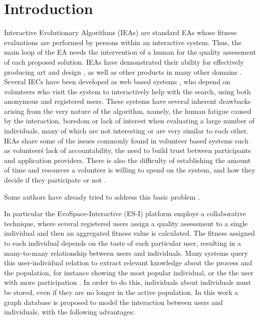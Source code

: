 \documentclass[conference]{IEEEtran}
\begin{document}
\section{Introduction}
Interactive Evolutionary Algorithms (IEAs) are standard EAs whose
fitness evaluations are performed by persons within an interactive 
system.  Thus, the main loop of the EA needs the intervention of a
human for the quality assessment of each proposed solution.
IEAs have demonstrated their ability for effectively
producing art and design \cite{Bentley:1999:intro,Sims:1991,todd:1992},
as well as other products in many other domains \cite{ie1}. 
Several IECs have been developed as web based systems \cite{picbreeder},
who depend on volunteers who visit the system to interactively help
with the search, using both anonymous and registered users.
These systems have several inherent drawbacks arising from the very nature of 
the algorithm, namely, the human fatigue caused by the interaction,
boredom or lack of interest when evaluating a large number of individuals,
many of which are not interesting or are very similar to each other.
IEAs share some of the issues commonly found in volunteer based systems
\cite{sarmenta2001volunteer,web:BOINC} such as volunteer\'s lack of accountability,
the need to build trust between participants and application providers. 
There is also the difficulty of establishing the amount of time and resources
a volunteer is willing to spend on the system, and how they decide if they
participate or not \cite{JJ:2016}.


Some authors have already tried to address this basic problem
\cite{Frade:2010:EvoGAMES}. %


 In particular
the EvoSpace-Interactive (ES-I) %
platform employs a collaborative technique,
where several registered users assign a quality assessment to a single
individual and then an aggregated fitness value is calculated. The fitness
assigned to each individual depends on the taste of each particular user, 
resulting in a many-to-many relationship between users and individuals. 
Many systems query this user-individual relation to extract relevant
knowledge about the process and the population, for instance showing the
most popular individual, or the the user with more participation \cite{picbreeder}.
In order to do this, individuals about individuals %
must be stored, even
if they are no longer in the active population. In this work a graph database
is proposed to model the interaction between users and individuals, with
the following advantages:
\end{document}

